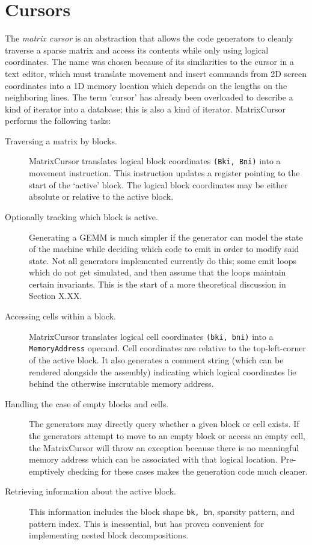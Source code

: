 \section{Cursors}


    The \emph{matrix cursor} is an abstraction that allows the code generators to cleanly traverse a sparse matrix and access its contents while only using logical coordinates. The name was chosen because of its similarities to the cursor in a text editor, which must translate movement and insert commands from 2D screen coordinates into a 1D memory location which depends on the lengths on the neighboring lines. The term 'cursor' has already been overloaded to describe a kind of iterator into a database; this is also a kind of iterator. MatrixCursor performs the following tasks:

    \begin{description}

    \item[Traversing a matrix by blocks.] MatrixCursor translates logical block coordinates \texttt{(Bki, Bni)} into a movement instruction. This instruction updates a register pointing to the start of the `active' block. The logical block coordinates may be either absolute or relative to the active block.

    \item[Optionally tracking which block is active.] Generating a GEMM is much simpler if the generator can model the state of the machine while deciding which code to emit in order to modify said state. Not all generators implemented currently do this; some emit loops which do not get simulated, and then assume that the loops maintain certain invariants. This is the start of a more theoretical discussion in Section X.XX. 

    \item[Accessing cells within a block.] MatrixCursor translates logical cell coordinates \texttt{(bki, bni)} into a \texttt{MemoryAddress} operand. Cell coordinates are relative to the top-left-corner of the active block. It also generates a comment string (which can be rendered alongside the assembly) indicating which logical coordinates lie behind the otherwise inscrutable memory address.

    \item[Handling the case of empty blocks and cells.] The generators may directly query whether a given block or cell exists. If the generators attempt to move to an empty block or access an empty cell, the MatrixCursor will throw an exception because there is no meaningful memory address which can be associated with that logical location. Pre-emptively checking for these cases makes the generation code much cleaner.

    \item[Retrieving information about the active block.] This information includes the block shape \texttt{bk, bn}, sparsity pattern, and pattern index. This is inessential, but has proven convenient for implementing nested block decompositions.

    \end{description}

